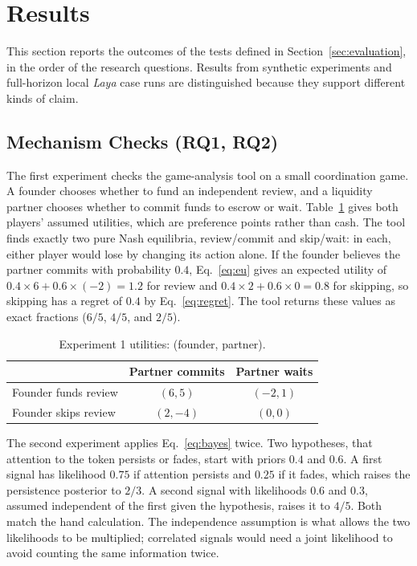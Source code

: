 \section{Results}\label{sec:results}
This section reports the outcomes of the tests defined in
Section~\ref{sec:evaluation}, in the order of the research questions. Results
from synthetic experiments and full-horizon local \textit{Laya} case runs
are distinguished because they support different kinds of claim.

\subsection{Mechanism Checks (RQ1, RQ2)}\label{sec:res-mechanisms}
The first experiment checks the game-analysis tool on a small coordination
game. A founder chooses whether to fund an independent review, and a
liquidity partner chooses whether to commit funds to escrow or wait.
Table~\ref{tab:game} gives both players' assumed utilities, which are
preference points rather than cash. The tool finds exactly two pure Nash
equilibria, review/commit and skip/wait: in each, either player would lose by
changing its action alone. If the founder believes the partner commits with
probability $0.4$, Eq.~\eqref{eq:eu} gives an expected utility of
$0.4\times6+0.6\times(-2)=1.2$ for review and $0.4\times2+0.6\times0=0.8$ for
skipping, so skipping has a regret of $0.4$ by Eq.~\eqref{eq:regret}. The tool
returns these values as exact fractions ($6/5$, $4/5$, and $2/5$).

\begin{table}[t]
\caption{Experiment 1 utilities: (founder, partner).}
\label{tab:game}
\centering\footnotesize
\begin{tabular}{@{}lcc@{}}
\toprule & Partner commits & Partner waits \\
\midrule
Founder funds review & $(6,5)$ & $(-2,1)$ \\
Founder skips review & $(2,-4)$ & $(0,0)$ \\
\bottomrule
\end{tabular}
\end{table}

The second experiment applies Eq.~\eqref{eq:bayes} twice. Two hypotheses,
that attention to the token persists or fades, start with priors $0.4$ and
$0.6$. A first signal has likelihood $0.75$ if attention persists and $0.25$
if it fades, which raises the persistence posterior to $2/3$. A second signal
with likelihoods $0.6$ and $0.3$, assumed independent of the first given the
hypothesis, raises it to $4/5$. Both match the hand calculation. The
independence assumption is what allows the two likelihoods to be multiplied;
correlated signals would need a joint likelihood to avoid counting the same
information twice.

